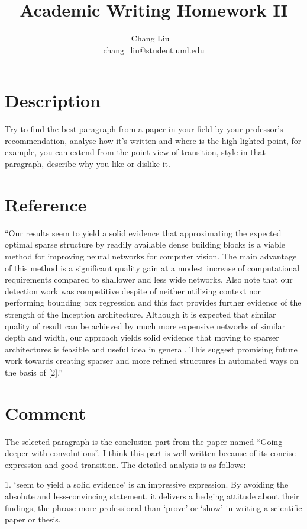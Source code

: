 \documentclass{article}
\title{Academic Writing Homework II}
\author{Chang Liu ~\\ chang\_liu@student.uml.edu}
\begin{document}
\maketitle

\section{Description}

Try to find the best paragraph from a paper in your field by your professor's recommendation, analyse how it's written and where is the high-lighted point, for example, you can extend from the point view of transition, style in that paragraph, describe why you like or dislike it.

\section{Reference} 
``Our results seem to yield a solid evidence that approximating the expected optimal sparse structure
by readily available dense building blocks is a viable method for improving neural networks for
computer vision. The main advantage of this method is a significant quality gain at a modest increase
of computational requirements compared to shallower and less wide networks. Also note that
our detection work was competitive despite of neither utilizing context nor performing bounding box
regression and this fact provides further evidence of the strength of the Inception architecture. Although
it is expected that similar quality of result can be achieved by much more expensive networks
of similar depth and width, our approach yields solid evidence that moving to sparser architectures
is feasible and useful idea in general. This suggest promising future work towards creating sparser
and more refined structures in automated ways on the basis of [2].''


\section{Comment}
The selected paragraph is the conclusion part from the paper named ``Going deeper with convolutions''. I think this part is well-written because of its concise expression and good transition. The detailed analysis is as follows:

1. `seem to yield a solid evidence' is an impressive expression. By avoiding the absolute and less-convincing statement, it delivers a hedging attitude about their findings, the phrase more professional than `prove' or `show' in writing a scientific paper or thesis.
\end{document}
